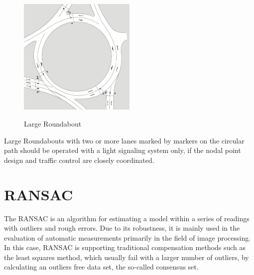 \begin{figure}[!ht]
\caption{Large Roundabout \cite{man06}}
\includegraphics[width=0.5\textwidth]{bilder/large_roundabout.png} %
\label{roundabout_large}
\end{figure}

Large Roundabouts with two or more lanes marked by markers on the circular path should be operated with a light signaling system only,
if the nodal point design and traffic control are closely coordinated.


\section{\acl{RANSAC}}

The \ac{RANSAC} \cite{Fischler1981} is an algorithm for estimating a model within a series of readings with outliers and rough errors. Due to its robustness, 
it is mainly used in the evaluation of automatic measurements primarily in the field of image processing. 
In this case, \ac{RANSAC} is supporting traditional compensation methods such as the least squares method, which usually fail with a larger number of outliers,
by calculating an outliers free data set, the so-called consensus set. 

